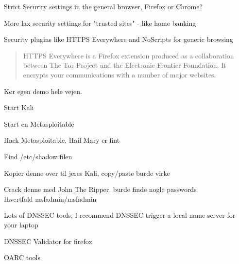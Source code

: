 \documentclass[20pt,landscape,a4paper,footrule]{foils}
\begin{document}


\begin{list2}
\item Strict Security settings in the general browser, Firefox or Chrome?
\item More lax security settings for "trusted sites" - like home banking
\item Security plugins like HTTPS Everywhere and NoScripts for generic browsing
\end{list2}


\begin{quote}
HTTPS Everywhere is a Firefox extension produced as a collaboration between The Tor Project and the Electronic Frontier Foundation. It encrypts your communications with a number of major websites.
\end{quote}

\centerline{}



Kør egen demo hele vejen.

\begin{list2}
\item Start Kali
\item Start en Metasploitable
\item Hack Metasploitable, Hail Mary er fint \smiley
\item Find /etc/shadow filen
\item Kopier denne over til jeres Kali, copy/paste burde virke
\item Crack denne med John The Ripper, burde finde nogle passwords\\
Ihvertfald msfadmin/msfadmin
\end{list2}



Lots of DNSSEC tools, I recommend DNSSEC-trigger a local name server for your laptop

\begin{list2}
\item DNSSEC Validator for firefox\\ 
\item OARC tools 
\item {}
\end{list2}
\end{document}
